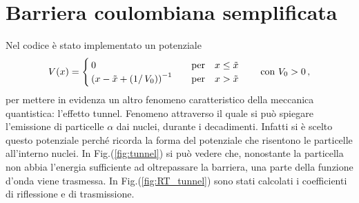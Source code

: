 \documentclass[12pt]{report}
\begin{document}
\section{Barriera coulombiana semplificata}
\label{sec:coulomb}

Nel codice è stato implementato un potenziale
\begin{equation}
    \centering
    V(x) = 
    \begin{cases}
        \, 0 \quad &\text{per} \quad x \le \tilde{x} \\
        \, \left( x - \tilde{x} + (1 / \, V_0)\right)^{-1} \quad &\text{per} \quad x > \tilde{x} 
    \end{cases}
    \qquad \text{con  } V_0 > 0 \, \text{,}
    \label{eq:tunnel}
\end{equation} 
per mettere in evidenza un altro fenomeno caratteristico della meccanica quantistica: l'effetto tunnel.
Fenomeno attraverso il quale si può spiegare l'emissione di particelle $\alpha$ dai nuclei, durante i decadimenti. Infatti si è scelto questo potenziale perché ricorda la forma del potenziale che risentono le particelle all'interno nuclei.
In Fig.(\ref{fig:tunnel}) si può vedere che, nonostante la particella non abbia l'energia sufficiente ad oltrepassare la barriera, una parte della funzione d'onda viene trasmessa. In Fig.(\ref{fig:RT_tunnel}) sono stati calcolati i coefficienti di riflessione e di trasmissione.
\end{document}
